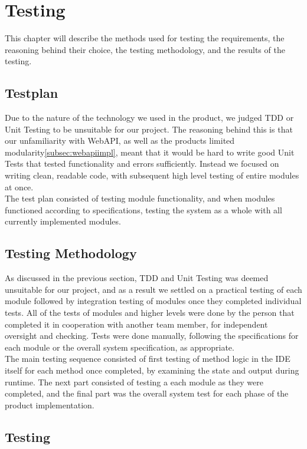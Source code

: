 \section{Testing}

This chapter will describe the methods used for testing the requirements, the reasoning behind their choice, the testing methodology, and the results of the testing.

\subsection{Testplan}

Due to the nature of the technology we used in the product, we judged TDD or Unit Testing to be unsuitable for our project. The reasoning behind this
is that our unfamiliarity with WebAPI, as well as the products limited modularity\ref{subsec:webapiimpl}, meant that it would be hard to
write good Unit Tests that tested functionality and errors sufficiently. Instead we focused on writing clean, readable code, with subsequent high level testing
of entire modules at once.
\\
The test plan consisted of testing module functionality, and when modules functioned according to specifications, testing the system as a whole with all currently
implemented modules.

\subsection{Testing Methodology}

As discussed in the previous section, TDD and Unit Testing was deemed unsuitable for our project, and as a result we settled on a practical testing of each module
followed by integration testing of modules once they completed individual tests. All of the tests of modules and higher levels were done by the person that completed it
in cooperation with another team member, for independent oversight and checking. Tests were done manually, following the specifications for each module or the overall system
specification, as appropriate.
\\
The main testing sequence consisted of first testing of method logic in the IDE itself for each method once completed, by examining the state and output during runtime.
The next part consisted of testing a each module as they were completed, and the final part was the overall system test for each phase of the product implementation.

\subsection{Testing}

